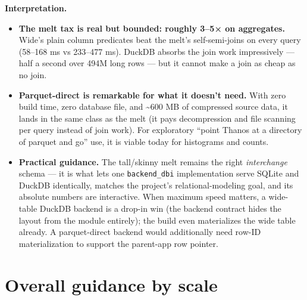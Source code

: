 \documentclass[
  11pt,
]{article}
\providecommand{\tightlist}{%
  \setlength{\itemsep}{0pt}\setlength{\parskip}{0pt}}
\begin{document}
\textbf{Interpretation.}

\begin{itemize}
\tightlist
\item
  \textbf{The melt tax is real but bounded: roughly 3--5× on
  aggregates.} Wide's plain column predicates beat the melt's
  self-semi-joins on every query (58--168 ms vs 233--477 ms). DuckDB
  absorbs the join work impressively --- half a second over 494M long
  rows --- but it cannot make a join as cheap as no join.
\item
  \textbf{Parquet-direct is remarkable for what it doesn't need.} With
  zero build time, zero database file, and \textasciitilde600 MB of
  compressed source data, it lands in the same class as the melt (it
  pays decompression and file scanning per query instead of join work).
  For exploratory ``point Thanos at a directory of parquet and go'' use,
  it is viable today for histograms and counts.
\item
  \textbf{Practical guidance.} The tall/skinny melt remains the right
  \emph{interchange} schema --- it is what lets one
  \texttt{backend\_dbi} implementation serve SQLite and DuckDB
  identically, matches the project's relational-modeling goal, and its
  absolute numbers are interactive. When maximum speed matters, a
  wide-table DuckDB backend is a drop-in win (the backend contract hides
  the layout from the module entirely); the build even materializes the
  wide table already. A parquet-direct backend would additionally need
  row-ID materialization to support the parent-app row pointer.
\end{itemize}

\section{Overall guidance by scale}\label{overall-guidance-by-scale}
\end{document}
